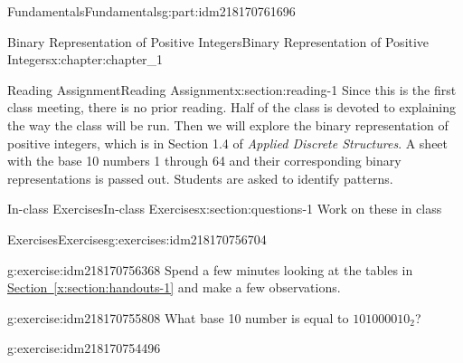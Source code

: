 \documentclass[oneside,10pt,]{book}
\newcommand{\xreffont}{\relax}
\numberwithin{equation}{section}
\begin{document}
\begin{partptx}{Fundamentals}{}{Fundamentals}{}{}{g:part:idm218170761696}
%
\typeout{************************************************}
\typeout{************************************************}
%
\begin{chapterptx}{Binary Representation of Positive Integers}{}{Binary Representation of Positive Integers}{}{}{x:chapter:chapter_1}
%
%
%
\typeout{************************************************}
\typeout{************************************************}
%
\begin{sectionptx}{Reading Assignment}{}{Reading Assignment}{}{}{x:section:reading-1}
Since this is the first class meeting, there is no prior reading.  Half of the class is devoted to explaining the way the class will be run.  Then we will explore the binary representation of positive integers, which is in Section 1.4 of \emph{Applied Discrete Structures}.  A sheet with the base 10 numbers 1 through 64 and their corresponding binary representations is passed out.  Students are asked to identify patterns.%
\end{sectionptx}
%
%
\typeout{************************************************}
\typeout{************************************************}
%
\begin{sectionptx}{In-class Exercises}{}{In-class Exercises}{}{}{x:section:questions-1}
Work on these in class%
%
%
\typeout{************************************************}
\typeout{************************************************}
%
\begin{exercises-subsection-numberless}{Exercises}{}{Exercises}{}{}{g:exercises:idm218170756704}
\par\medskip\noindent%
%
\begin{exercisegroup}
\begin{divisionexerciseeg}{1}{}{}{g:exercise:idm218170756368}%
Spend a few minutes looking at the tables in \hyperref[x:section:handouts-1]{Section~{\xreffont\ref{x:section:handouts-1}}} and make a few observations.%
\end{divisionexerciseeg}%
\begin{divisionexerciseeg}{2}{}{}{g:exercise:idm218170755808}%
What base 10 number is equal to \(101000010_2\)?%
\end{divisionexerciseeg}%
\begin{divisionexerciseeg}{3}{}{}{g:exercise:idm218170754496}%

\end{divisionexerciseeg}
\end{exercisegroup}
\end{exercises-subsection-numberless}
\end{sectionptx}
\end{chapterptx}
\end{partptx}
\end{document}

